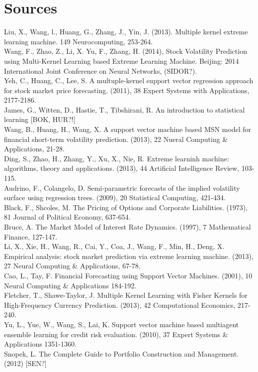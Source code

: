 \documentclass{article}
\begin{document}
\section{Sources}
Liu, X., Wang, l., Huang, G., Zhang, J., Yin, J. (2013). Multiple kernel extreme learning machine. 149 Neurocomputing, 253-264. \\
Wang, F., Zhao, Z., Li, X. Yu, F., Zhang, H. (2014), Stock Volatility Prediction using Multi-Kernel Learning based Extreme Learning Machine. Beijing: 2014 International Joint Conference on Neural Networks, (SIDOR?). \\
Yeh, C., Huang, C., Lee, S. A multuple-kernel support vector regression approach for stock market price forecasting. (2011), 38 Expert Systems with Applications, 2177-2186. \\
James, G., Witten, D., Hastie, T., Tibshirani, R. An introduction to statistical learning [BOK, HUR?!] \\
Wang, B., Huang, H., Wang, X. A support vector machine based MSN model for financial short-term volatility prediction. (2013), 22 Nueral Computing \& Applications, 21-28. \\
Ding, S., Zhao, H., Zhang, Y., Xu, X., Nie, R. Extreme learninh machine: algorithms, theory and applications. (2013), 44 Artificial Intelligence Review, 103-115. \\
Audrino, F., Colangelo, D. Semi-parametric forecasts of the implied volatility surface using regression trees. (2009), 20 Statistical Computing, 421-434. \\
Black, F., Shcoles, M. The Pricing of Options and Corporate Liabilities. (1973), 81 Journal of Political Economy, 637-654. \\
Bruce, A. The Market Model of Interest Rate Dynamics. (1997), 7 Mathematical Finance, 127-147. \\
Li, X., Xie, H., Wang, R., Cai, Y., Coa, J., Wang, F., Min, H., Deng, X. Empirical analysis: stock market prediction via extreme learning machine. (2013), 27 Neural Computing \& Applications, 67-78. \\
Cao, L., Tay, F. Financial Forecasting using Support Vector Machines. (2001), 10 Neural Computing \& Applications 184-192. \\
Fletcher, T., Shawe-Taylor, J. Multiple Kernel Learning with Fisher Kernels for High-Frequency Currency Prediction. (2013), 42 Computational Economics, 217-240. \\
Yu, L., Yue, W., Wang, S., Lai, K. Support vector machine based multiagent ensemble learning for credit risk evaluation. (2010), 37 Expert Systems \& Applications 1351-1360. \\
Snopek, L. The Complete Guide to Portfolio Construction and Management. (2012) [SEN?] \\
\end{document}
